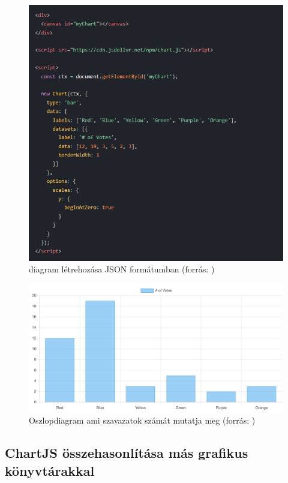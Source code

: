 \begin{figure}[h]
\centering
\includegraphics[scale=0.6]{images/chartExample.png}
\caption{diagram létrehozása JSON formátumban (forrás: \cite{ChartJS})}
\end{figure}

\begin{figure}[h]
\centering
\includegraphics[scale=0.3]{images/barChartJSExample.png}
\caption{Oszlopdiagram ami szavazatok számát mutatja meg (forrás: \cite{ChartJS})}
\end{figure}

\subsection{ChartJS összehasonlítása más grafikus könyvtárakkal}

